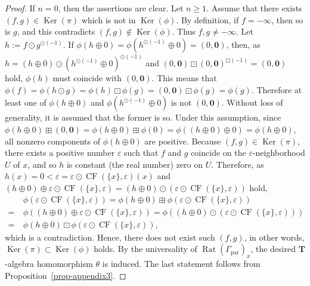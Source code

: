 \documentclass[a4paper,12pt]{amsart}
\def\Gamma{\varGamma}
\begin{document}
\begin{proof}
If $n = 0$, then the assertions are clear.
Let $n \ge 1$.
Assume that there exists $(f, g) \in \operatorname{Ker}(\pi)$ which is not in $\operatorname{Ker}(\phi)$.
By definition, if $f = -\infty$, then so is $g$, and this contradicts $(f, g) \not\in \operatorname{Ker}(\phi)$.
Thus $f, g \not= -\infty$.
Let $h := f \odot g^{\odot (-1)}$.
If $\phi(h \oplus 0) = \phi(h^{\odot (-1)} \oplus 0) = (0, \boldsymbol{0})$, then, as $h = (h \oplus 0) \odot (h^{\odot (-1)} \oplus 0)^{\odot (-1)}$ and $(0, \boldsymbol{0}) \boxdot (0, \boldsymbol{0})^{\boxdot (-1)} = (0, \boldsymbol{0})$ hold, $\phi(h)$ must coincide with $(0, \boldsymbol{0})$.
This means that $\phi(f) = \phi(h \odot g) = \phi(h) \boxdot \phi(g) = (0, \boldsymbol{0}) \boxdot \phi(g) = \phi(g)$.
Therefore at least one of $\phi(h \oplus 0)$ and $\phi(h^{\odot (-1)} \oplus 0)$ is not $(0, \boldsymbol{0})$.
Without loss of generality, it is assumed that the former is so.
Under this assumption, since $\phi(h \oplus 0) \boxplus (0, \boldsymbol{0}) = \phi(h \oplus 0) \boxplus \phi(0) = \phi((h \oplus 0) \oplus 0) = \phi(h \oplus 0)$, all nonzero components of $\phi(h \oplus 0)$ are positive.
Because $(f, g) \in \operatorname{Ker}(\pi)$, there exists a positive number $\varepsilon$ such that $f$ and $g$ coincide on the $\varepsilon$-neighborhood $U$ of $x$, and so $h$ is constant (the real number) zero on $U$.
Therefore, as $h(x) = 0 < \varepsilon = \varepsilon \odot \operatorname{CF}(\{ x \}, \varepsilon)(x)$ and $(h \oplus 0) \oplus \varepsilon \odot \operatorname{CF}(\{ x \}, \varepsilon) = (h \oplus 0) \odot (\varepsilon \odot \operatorname{CF}(\{ x \}, \varepsilon))$ hold,
\begin{align*}
&~ \phi(\varepsilon \odot \operatorname{CF}(\{ x \} ,\varepsilon)) = \phi(h \oplus 0) \boxplus \phi(\varepsilon \odot \operatorname{CF}(\{ x \}, \varepsilon))\\
=&~ \phi((h \oplus 0) \oplus \varepsilon \odot \operatorname{CF}(\{ x \}, \varepsilon)) = \phi((h \oplus 0) \odot (\varepsilon \odot \operatorname{CF}(\{ x \}, \varepsilon)))\\
=&~ \phi(h \oplus 0) \boxdot \phi(\varepsilon \odot \operatorname{CF}(\{ x\}, \varepsilon)),
\end{align*}
which is a contradiction.
Hence, there does not exist such $(f, g)$, in other words, $\operatorname{Ker}(\pi) \subset \operatorname{Ker}(\phi)$ holds.
By the universality of $\operatorname{Rat}(\Gamma_{\operatorname{par}})_x$, the desired $\boldsymbol{T}$-algebra homomorphism $\theta$ is induced.
The last statement follows from Proposition~\ref{prop-appendix3}.
\end{proof}
\end{document}
